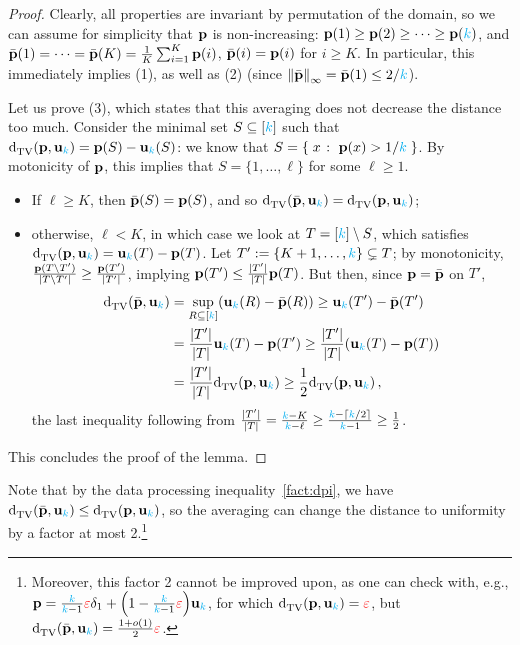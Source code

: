 \begin{proof}
Clearly, all properties are invariant by permutation of the domain, so we can assume for simplicity that $\mathbf{p}$ is non-increasing: $\mathbf{p}(1)\geq \mathbf{p}(2)\geq \dots \geq \mathbf{p}({\textcolor{cyan}{k}})$, and 
$\bar{\mathbf{p}}(1) = \dots = \bar{\mathbf{p}}(K) = \frac{1}{K}\sum_{i=1}^K \mathbf{p}(i)$, $\bar{\mathbf{p}}(i)=\mathbf{p}(i)$ for $i\geq K$. In particular, this immediately implies (1), as well as (2) (since $\norminf{\bar{\p}} = \bar{\p}(1) \leq 2/\ab$).

Let us prove (3), which states that this averaging does not decrease the distance too much. Consider the minimal set $S\subseteq[{\textcolor{cyan}{k}}]$ such that $\totalvardist{\p}{\uniform_\ab} = \p(S)-\uniform_\ab(S)$: we know that $S = \setOfSuchThat{ x}{\p(x) > 1/\ab}$. By motonicity of $\mathbf{p}$, this implies that $S = \{1,\dots,\ell\}$ for some $\ell\geq 1$.
\begin{itemize}
  \item If $\ell \geq K$, then $\bar{\mathbf{p}}(S)=\mathbf{p}(S)$, and so $\totalvardist{\bar{\p}}{\uniform_\ab} = \totalvardist{\p}{\uniform_\ab}$;
  \item otherwise, $\ell < K$, in which case we look at $T=[{\textcolor{cyan}{k}}]\setminus S$, which satisfies $\totalvardist{\p}{\uniform_\ab} = \uniform_\ab(T) - \p(T)$. Let $T' := \{K+1, \dots, {\textcolor{cyan}{k}}\}\subsetneq T$; by monotonicity, 
  $\frac{\mathbf{p}(T\setminus T')}{|T\setminus T'|}\geq \frac{\mathbf{p}(T')}{|T'|}$, implying $\mathbf{p}(T') \leq \frac{|T'|}{|T|} \mathbf{p}(T)$. But then, since $\mathbf{p} = \bar{\mathbf{p}}$ on $T'$,
  \begin{align*}
     \totalvardist{\bar{\p}}{\uniform_\ab} &= \sup_{R\subseteq [\ab]} \Paren{\uniform_\ab(R) - \bar{\p}(R)} \geq  \uniform_\ab(T') - \bar{\p}(T') \\
     &= \frac{|T'|}{|T|}\uniform_\ab(T)-\p(T') \geq \frac{|T'|}{|T|} \Paren{\uniform_\ab(T)-\p(T)} \\
     &= \frac{|T'|}{|T|}\totalvardist{\p}{\uniform_\ab} \geq \frac{1}{2}\totalvardist{\p}{\uniform_\ab}\,,
  \end{align*}
  the last inequality following from $\frac{|T'|}{|T|} = \frac{\ab-K}{\ab-\ell} \geq \frac{\ab - \clg{\ab/2}}{\ab-1} \geq \frac{1}{2}$.
\end{itemize}
This concludes the proof of the lemma.
\end{proof}
Note that by the data processing inequality~\cref{fact:dpi}, we have $\totalvardist{\bar{\p}}{\uniform_\ab}\leq \totalvardist{\p}{\uniform_\ab}$, so the averaging can change the distance to uniformity by a factor at most 2.\footnote{Moreover, this factor 2 cannot be improved upon, as one can check with, e.g., $\p = \frac{\ab}{\ab-1}\dst \delta_1 + \Paren{1-\frac{\ab}{\ab-1}\dst} \uniform_\ab$, for which $\totalvardist{\p}{\uniform_\ab} = \dst$, but $\totalvardist{\bar{\p}}{\uniform_\ab} = \frac{1+o(1)}{2}\dst$.}

